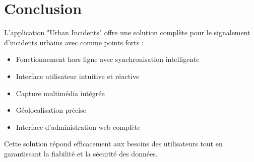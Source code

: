 \documentclass[12pt,a4paper]{article}
\begin{document}
\section*{Conclusion}

L'application "Urban Incidents" offre une solution complète pour le signalement d'incidents urbains avec comme points forts :
\begin{itemize}
    \item Fonctionnement hors ligne avec synchronisation intelligente
    \item Interface utilisateur intuitive et réactive
    \item Capture multimédia intégrée
    \item Géolocalisation précise
    \item Interface d'administration web complète
\end{itemize}

Cette solution répond efficacement aux besoins des utilisateurs tout en garantissant la fiabilité et la sécurité des données.
\end{document}
